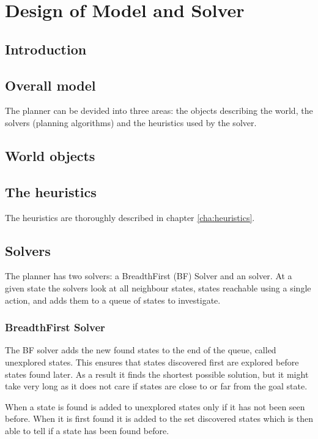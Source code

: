 \chapter{Design of Model and Solver}
\label{cha:design}

\section{Introduction}

\section{Overall model}

The planner can be devided into three areas: the objects describing the world, the solvers (planning algorithms) and the heuristics used by the \astar solver.

\section{World objects}

\section{The heuristics}
The heuristics are thoroughly described in chapter \ref{cha:heuristics}.

\section{Solvers}
The planner has two solvers: a BreadthFirst (BF) Solver and an \astar solver. At a given state the solvers look at all neighbour states, states reachable using a single action, and adds them to a queue of states to investigate.
\subsection{BreadthFirst Solver}
The BF solver adds the new found states to the end of the queue, called unexplored states. This ensures that states discovered first are explored before states found later. As a result it finds the shortest possible solution, but it might take very long as it does not care if states are close to or far from the goal state.

When a state is found is added to unexplored states only if it has not been seen before. When it is first found it is added to the set discovered states which is then able to tell if a state has been found before.

